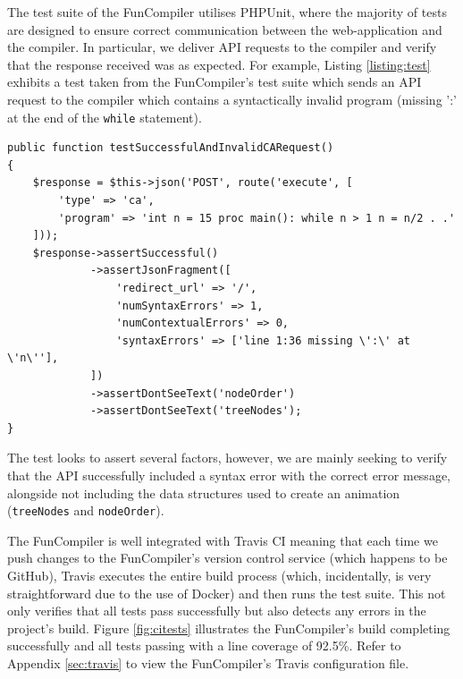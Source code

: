 \documentclass{l4proj}
\begin{document}
The test suite of the FunCompiler utilises PHPUnit, where the majority of tests are designed to ensure correct communication between the web-application and the compiler. In particular, we deliver API requests to the compiler and verify that the response received was as expected. For example, Listing \ref{listing:test} exhibits a test taken from the FunCompiler's test suite which sends an API request to the compiler which contains a syntactically invalid program (missing ':' at the end of the \texttt{while} statement).
\begin{lstlisting}[language=myphp,caption=FunCompiler API test,label=listing:test]
public function testSuccessfulAndInvalidCARequest()
{
    $response = $this->json('POST', route('execute', [
        'type' => 'ca',
        'program' => 'int n = 15 proc main(): while n > 1 n = n/2 . .'
    ]));
    $response->assertSuccessful()
             ->assertJsonFragment([
                 'redirect_url' => '/',
                 'numSyntaxErrors' => 1,
                 'numContextualErrors' => 0,
                 'syntaxErrors' => ['line 1:36 missing \':\' at \'n\''],
             ])
             ->assertDontSeeText('nodeOrder')
             ->assertDontSeeText('treeNodes');
}
\end{lstlisting}

The test looks to assert several factors, however, we are mainly seeking to verify that the API successfully included a syntax error with the correct error message, alongside not including the data structures used to create an animation (\texttt{treeNodes} and \texttt{nodeOrder}).

The FunCompiler is well integrated with Travis CI meaning that each time we push changes to the FunCompiler's version control service (which happens to be GitHub), Travis executes the entire build process (which, incidentally, is very straightforward due to the use of Docker) and then runs the test suite. This not only verifies that all tests pass successfully but also detects any errors in the project's build. Figure \ref{fig:citests} illustrates the FunCompiler's build completing successfully and all tests passing with a line coverage of 92.5\%. Refer to Appendix \ref{sec:travis} to view the FunCompiler's Travis configuration file.
\end{document}
